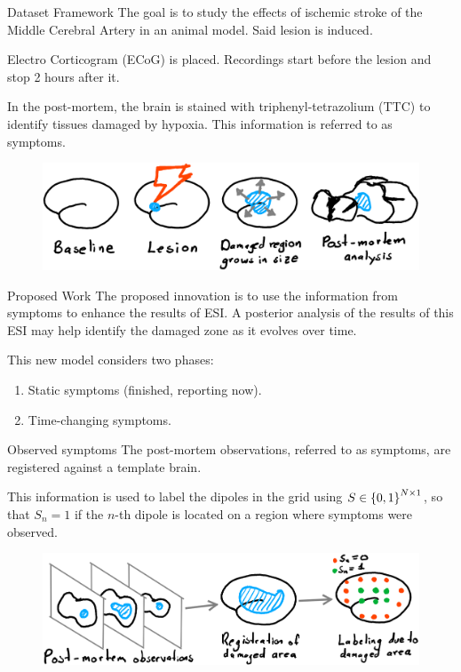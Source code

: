 \documentclass[progressbar=head]{beamer}
\begin{document}
\begin{frame}{Dataset Framework}
The goal is to study the effects of
ischemic stroke of the Middle Cerebral Artery in an animal
model. 
Said lesion is induced.

Electro Corticogram (ECoG) is placed. Recordings start before the lesion and stop 2 hours after it.

In the post-mortem, the brain is stained with
triphenyl-tetrazolium (TTC)
to identify tissues damaged by hypoxia. This information is referred to as \alert{symptoms}.

\begin{figure}
\centering
\includegraphics[width=0.8\linewidth]{./img_oldbeamer/sketch01_v2}
\end{figure}
\end{frame}

\begin{frame}{Proposed Work}
The proposed innovation is to use the information from {symptoms} to enhance the results of ESI.
%
A posterior analysis of the results of this ESI may help identify the damaged zone as it evolves over time.

This new model considers two phases:
\begin{enumerate}
    \item Static symptoms (finished, reporting now).
    \item Time-changing symptoms.
\end{enumerate}
\end{frame}





\begin{frame}{Observed symptoms}
The post-mortem observations, referred to as \alert{symptoms}, are registered against a template brain. 

This information is used to label the dipoles in the grid using
${S\in \left\{ 0,1 \right\}^{N\times 1}}$, so that $S_n = 1$ if the $n$-th dipole is located on a region where symptoms were observed.

\begin{figure}
\centering
\includegraphics[width=0.8\linewidth]{./img_oldbeamer/sketch02_v2}
\end{figure}

\end{frame}
\end{document}
